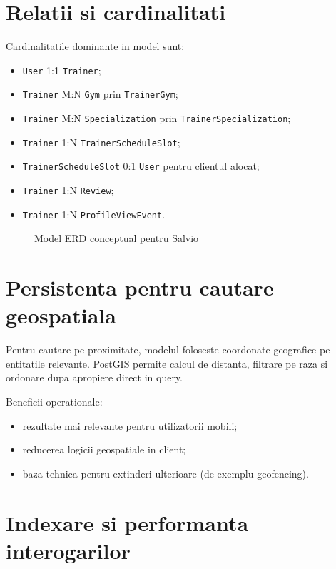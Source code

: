 \section{Relatii si cardinalitati}

Cardinalitatile dominante in model sunt:
\begin{itemize}[leftmargin=1.2cm]
    \item \texttt{User} 1:1 \texttt{Trainer};
    \item \texttt{Trainer} M:N \texttt{Gym} prin \texttt{TrainerGym};
    \item \texttt{Trainer} M:N \texttt{Specialization} prin \texttt{TrainerSpecialization};
    \item \texttt{Trainer} 1:N \texttt{TrainerScheduleSlot};
    \item \texttt{TrainerScheduleSlot} 0:1 \texttt{User} pentru clientul alocat;
    \item \texttt{Trainer} 1:N \texttt{Review};
    \item \texttt{Trainer} 1:N \texttt{ProfileViewEvent}.
\end{itemize}

\begin{figure}[H]
\centering
{}
\caption{Model ERD conceptual pentru Salvio}
\end{figure}

\section{Persistenta pentru cautare geospatiala}

Pentru cautare pe proximitate, modelul foloseste coordonate geografice pe entitatile relevante. PostGIS permite calcul de distanta, filtrare pe raza si ordonare dupa apropiere direct in query.

Beneficii operationale:
\begin{itemize}[leftmargin=1.2cm]
    \item rezultate mai relevante pentru utilizatorii mobili;
    \item reducerea logicii geospatiale in client;
    \item baza tehnica pentru extinderi ulterioare (de exemplu geofencing).
\end{itemize}

\section{Indexare si performanta interogarilor}

